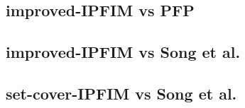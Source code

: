 
\subsection{improved-IPFIM vs PFP}
\subsection{improved-IPFIM vs Song et al.}
\subsection{set-cover-IPFIM vs Song et al.}